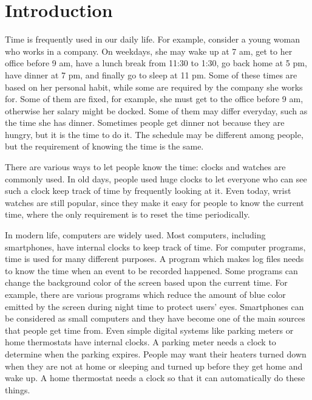 


\chapter{Introduction}
Time is frequently used in our daily life. For example, consider a young
woman who works in a company. On weekdays, she may wake up at 7 am, get to her
office before 9 am, have a lunch break from 11:30 to 1:30, go back home at 5
pm, have dinner at 7 pm, and finally go to sleep at 11 pm. Some of these times
are based on her personal habit, while some are required by the company she
works for.  Some of them are fixed, for example, she must get to the office
before 9 am, otherwise her salary might be docked. Some of them may differ
everyday, such as the time she has dinner. Sometimes people get dinner not
because they are hungry, but it is the time to do it. The schedule may be
different among people, but the requirement of knowing the time is the same.

There are various ways to let people know the time: clocks and watches are
commonly used. In old days, people used huge clocks to let everyone who can see
such a clock keep track of time by frequently looking at it. Even today, wrist
watches are still popular, since they make it easy for people to know the
current time, where the only requirement is to reset the time periodically.

In modern life, computers are widely used. Most computers, including
smartphones, have internal clocks to keep track of time. For computer programs, 
time is used for many different purposes. A program which makes log files needs
to know the time when an event to be recorded happened. Some programs can
change the background color of the screen based upon the current time. For
example, there are various programs which reduce the amount of blue color
emitted by the screen during night time to protect users' eyes.  Smartphones
can be considered as small computers and they have become one of the main
sources that people get time from. Even simple digital systems like parking
meters or home thermostats have internal clocks. A parking meter needs a clock
to determine when the parking expires. People may want their heaters turned
down when they are not at home or sleeping and turned up before they get home
and wake up. A home thermostat needs a clock so that it can automatically do
these things.

